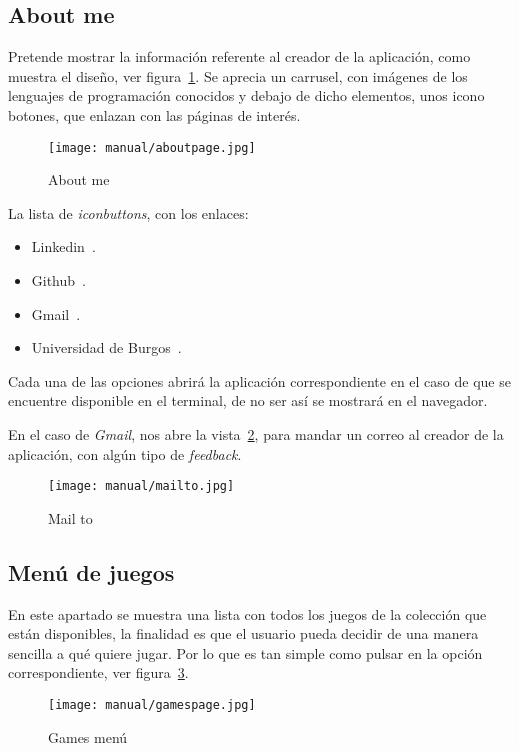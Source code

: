 \subsection{About me}\label{about}
Pretende mostrar la información referente al creador de la aplicación, como muestra el diseño, ver figura~\ref{fig:aboutpage}. Se aprecia un carrusel, con imágenes de los lenguajes de programación conocidos y debajo de dicho elementos, unos icono botones, que enlazan con las páginas de interés.

\begin{figure}%
	\centering
	\texttt{[image: manual/aboutpage.jpg]}
	\caption{About me}\label{fig:aboutpage}
\end{figure}

La lista de \emph{iconbuttons}, con los enlaces:
\begin{itemize}
	\item Linkedin~\cite{linkedin:cuenta}.
	\item Github~\cite{github:repo}.
	\item Gmail~\cite{mailto:mailto}.
	\item Universidad de Burgos~\cite{ubu:page}.
\end{itemize}

Cada una de las opciones abrirá la aplicación correspondiente en el caso de que se encuentre disponible en el terminal, de no ser así se mostrará en el navegador.

En el caso de \emph{Gmail}, nos abre la vista~\ref{fig:mailto}, para mandar un correo al creador de la aplicación, con algún tipo de \emph{feedback}.

\begin{figure}%
	\centering
	\texttt{[image: manual/mailto.jpg]}
	\caption{Mail to}\label{fig:mailto}
\end{figure}

\subsection{Menú de juegos}\label{menugames}
En este apartado se muestra una lista con todos los juegos de la colección que están disponibles, la finalidad es que el usuario pueda decidir de una manera sencilla a qué quiere jugar. Por lo que es tan simple como pulsar en la opción correspondiente, ver figura~\ref{fig:gamespage}.

\begin{figure}%
	\centering
	\texttt{[image: manual/gamespage.jpg]}
	\caption{Games menú}\label{fig:gamespage}
\end{figure}

